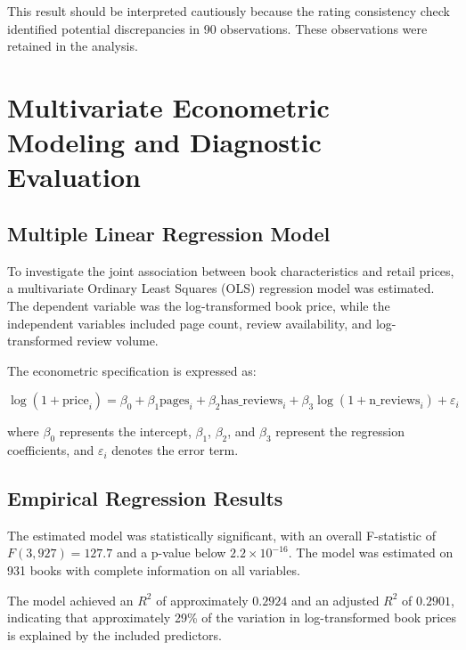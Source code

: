 \documentclass[11pt,a4paper]{article}
\begin{document}
This result should be interpreted cautiously because
the rating consistency check identified potential
discrepancies in 90 observations. These observations
were retained in the analysis.


\newpage
\section{Multivariate Econometric Modeling and Diagnostic Evaluation}

\subsection{Multiple Linear Regression Model}

To investigate the joint association between book characteristics and retail prices, a multivariate Ordinary Least Squares (OLS) regression model was estimated. The dependent variable was the log-transformed book price, while the independent variables included page count, review availability, and log-transformed review volume.

The econometric specification is expressed as:

\begin{equation}
\log(1+\text{price}_i)
=
\beta_0
+
\beta_1\text{pages}_i
+
\beta_2\text{has\_reviews}_i
+
\beta_3\log(1+\text{n\_reviews}_i)
+
\varepsilon_i
\end{equation}

where $\beta_0$ represents the intercept, $\beta_1$, $\beta_2$, and $\beta_3$ represent the regression coefficients, and $\varepsilon_i$ denotes the error term.

\subsection{Empirical Regression Results}

The estimated model was statistically significant, with an overall F-statistic of $F(3,927)=127.7$ and a p-value below $2.2 \times 10^{-16}$. The model was estimated on 931 books with complete information on all variables.

The model achieved an $R^2$ of approximately $0.2924$ and an adjusted $R^2$ of $0.2901$, indicating that approximately 29\% of the variation in log-transformed book prices is explained by the included predictors.
\end{document}
